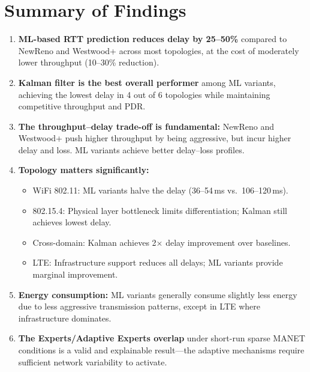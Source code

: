 \documentclass[12pt,a4paper]{article}
\begin{document}
\section{Summary of Findings}
\label{sec:summary}

\begin{enumerate}
    \item \textbf{ML-based RTT prediction reduces delay by 25--50\%} compared to NewReno and Westwood+ across most topologies, at the cost of moderately lower throughput (10--30\% reduction).

    \item \textbf{Kalman filter is the best overall performer} among ML variants, achieving the lowest delay in 4 out of 6 topologies while maintaining competitive throughput and PDR.

    \item \textbf{The throughput--delay trade-off is fundamental:} NewReno and Westwood+ push higher throughput by being aggressive, but incur higher delay and loss. ML variants achieve better delay--loss profiles.

    \item \textbf{Topology matters significantly:}
    \begin{itemize}[nosep]
        \item WiFi 802.11: ML variants halve the delay (36--54\,ms vs.~106--120\,ms).
        \item 802.15.4: Physical layer bottleneck limits differentiation; Kalman still achieves lowest delay.
        \item Cross-domain: Kalman achieves 2$\times$ delay improvement over baselines.
        \item LTE: Infrastructure support reduces all delays; ML variants provide marginal improvement.
    \end{itemize}

    \item \textbf{Energy consumption:} ML variants generally consume slightly less energy due to less aggressive transmission patterns, except in LTE where infrastructure dominates.

    \item \textbf{The Experts/Adaptive Experts overlap} under short-run sparse MANET conditions is a valid and explainable result---the adaptive mechanisms require sufficient network variability to activate.
\end{enumerate}
\end{document}
